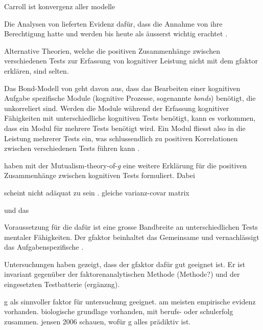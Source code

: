 \documentclass[11pt, twoside, a4paper]{book}		%
\begin{document}
Carroll ist konvergenz aller modelle




Die Analysen von \citeauthor{Carroll1993} lieferten Evidenz dafür, dass die Annahme von \citeauthor{Spearman1904, Spearman1927} ihre Berechtigung hatte und werden bis heute als äusserst wichtig erachtet \citep[für Erweiterungen der \gls{tst} siehe][]{McGrew2005, McGrew2009}.


Alternative Theorien, welche die positiven Zusammenhänge zwischen verschiedenen Tests zur Erfassung von kognitiver Leistung nicht mit dem \gls{gfaktor} erklären, sind selten. 

Das Bond-Modell von \citet{Thomson1916} geht davon aus, dass das Bearbeiten einer kognitiven Aufgabe spezifische Module (kognitive Prozesse, sogenannte \textit{bonds}) benötigt, die unkorreliert sind. Werden die Module während der Erfassung kognitiver Fähigkeiten mit unterschiedliche kognitiven Tests benötigt, kann es vorkommen, dass ein Modul für mehrere Tests benötigt wird. Ein Modul fliesst also in die Leistung mehrerer Tests ein, was schlussendlich zu positiven Korrelationen zwischen verschiedenen Tests führen kann \citep[für einen Gegenüberstellung zwischen dem \gls{gfaktor} und dem Bond-Modell siehe][]{Bartholomew2013}. 



\citet{VanDerMaas2006} haben mit der Mutualism-theory-of-\textit{g} eine weitere Erklärung für die positiven Zusammenhänge zwischen kognitiven Tests formuliert. Dabei

scheint nicht adäquat zu sein \citep{Gignac2014, Gignac2016}. gleiche varianz-covar matrix





 und das 

Voraussetzung für die dafür ist eine grosse Bandbreite an unterschiedlichen Tests mentaler Fähigkeiten. Der \gls{gfaktor} beinhaltet das Gemeinsame und vernachlässigt das Aufgabenspezifische \citep{Jensen1998a}.

Untersuchungen haben gezeigt, dass der \gls{gfaktor} dafür gut geeignet ist. Er ist invariant gegenüber der faktorenanalytischen Methode \citep{Jensen1994} (Methode?) und der eingesetzten Testbatterie \citep{Johnson2004, Johnson2008} (ergänzng). 


g als sinnvoller faktor für untersuchung geeignet. am meisten empirische evidenz vorhanden. biologische grundlage vorhanden, mit berufs- oder schulerfolg zusammen. jensen 2006 schauen, wofür g alles prädiktiv ist.
\end{document}
